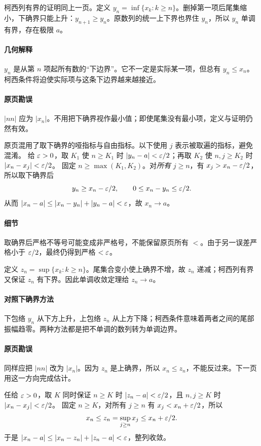 柯西列有界的证明同上一页。定义 $y_n=\inf\{x_k:k\ge n\}$。删掉第一项后尾集缩小，下确界只能上升：$y_{n+1}\ge y_n$。原数列的统一上下界也界住 $y_n$，所以 $y_n$ 单调有界，存在极限 $a$。
\paragraph{几何解释}$y_n$ 是从第 $n$ 项起所有数的“下边界”。它不一定是实际某一项，但总有 $y_n\le x_n$。柯西条件将迫使实际项与这条下边界越来越接近。
\paragraph{原页勘误}$|nn|$ 应为 $|x_n|$。不用把下确界视作最小值；即使尾集没有最小项，定义与证明仍然有效。

原页混用了取下确界的哑指标与自由指标。以下使用 $j$ 表示被取遍的指标，避免混淆。
给 $\varepsilon>0$，取 $K_1$ 使 $n\ge K_1$ 时 $|y_n-a|<\varepsilon/2$；再取 $K_2$ 使 $n,j\ge K_2$ 时 $|x_n-x_j|<\varepsilon/2$。
固定 $n\ge\max(K_1,K_2)$。对\emph{所有} $j\ge n$，有 $x_j>x_n-\varepsilon/2$，所以取下确界后
\[y_n\ge x_n-\varepsilon/2,\qquad 0\le x_n-y_n\le\varepsilon/2.\]
从而 $|x_n-a|\le|x_n-y_n|+|y_n-a|<\varepsilon$，故 $x_n\to a$。
\paragraph{细节}取确界后严格不等号可能变成非严格号，不能保留原页所有 $<$。由于另一误差严格小于 $\varepsilon/2$，最终仍得到严格 $<\varepsilon$。

定义 $z_n=\sup\{x_k:k\ge n\}$。尾集合变小使上确界不增，故 $z_n$ 递减；柯西列有界又保证 $z_n$ 有下界。因此单调收敛定理给 $z_n\to a$。
\paragraph{对照下确界方法}下包络 $y_n$ 从下方上升，上包络 $z_n$ 从上方下降；柯西条件意味着两者之间的尾部振幅趋零。两种方法都是把不单调的数列转为单调边界。
\paragraph{原页勘误}同样应把 $|nn|$ 改为 $|x_n|$。因为 $z_n$ 是上确界，所以 $x_n\le z_n$，不能反过来。下一页用这一方向完成估计。

任给 $\varepsilon>0$，取 $K$ 同时保证 $n\ge K$ 时 $|z_n-a|<\varepsilon/2$，且 $n,j\ge K$ 时 $|x_n-x_j|<\varepsilon/2$。
固定 $n\ge K$，对所有 $j\ge n$ 有 $x_j<x_n+\varepsilon/2$，所以
\[x_n\le z_n=\sup_{j\ge n}x_j\le x_n+\varepsilon/2.\]
于是 $|x_n-a|\le|x_n-z_n|+|z_n-a|<\varepsilon$，整列收敛。
